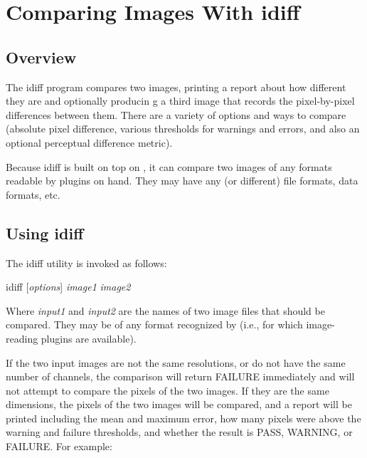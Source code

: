 \chapter{Comparing Images With {\kw idiff}}
\label{chap:idiff}

\section{Overview}
The {\cf idiff} program compares two images, printing a report about how
different they are and optionally producin
g a third image that records
the pixel-by-pixel differences between them.  There are a variety of
options and ways to compare (absolute pixel difference, various
thresholds for warnings and errors, and also an optional perceptual
difference metric).

Because {\cf idiff} is built on top on \product, it can compare two
images of any formats readable by \ImageInput plugins on hand.  They may
have any (or different) file formats, data formats, etc.

\section{Using {\cf idiff}}

The {\cf idiff} utility is invoked as follows:

\bigskip

\hspace{0.25in} {\cf idiff} [\emph{options}] \emph{image1} \emph{image2}

\medskip

Where \emph{input1} and \emph{input2} are the names of two image files
that should be compared.  They may be of any format recognized by
\product (i.e., for which image-reading plugins are available).

If the two input images are not the same resolutions, or do not have the
same number of channels, the comparison will return FAILURE immediately
and will not attempt to compare the pixels of the two images.  If 
they are the same dimensions, the pixels of the two images will be
compared, and a report will be printed including the mean and maximum
error, how many pixels were above the warning and failure thresholds,
and whether the result is {\cf PASS}, {\cf WARNING}, or {\cf FAILURE}.
For example:


